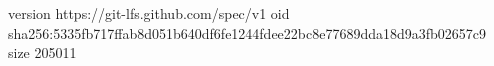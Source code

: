 version https://git-lfs.github.com/spec/v1
oid sha256:5335fb717ffab8d051b640df6fe1244fdee22bc8e77689dda18d9a3fb02657c9
size 205011
